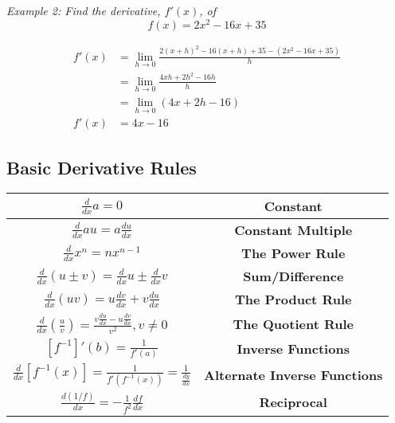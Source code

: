         \noindent \color{blue} \textit{Example 2: Find the derivative, $f'(x)$, of } \\

        \begin{equation*}
            f(x) = 2x^2-16x+35
        \end{equation*} \color{black}

        \begin{align*}
            f'(x) &= \lim_{h\to 0} \frac{2(x+h)^2-16(x+h)+35-(2x^2-16x+35)}{h} \\
            &= \lim_{h\to 0} \frac{4xh+2h^2-16h}{h} \\
            &= \lim_{h\to 0} (4x+2h-16) \\
            f'(x) &= 4x-16
        \end{align*}


    \subsection{Basic Derivative Rules}
        \begin{center}
            \begin{tabular}{|c|c|}
                \hline
                $\frac{d}{dx}a = 0$ & \textbf{Constant} \\
                \hline
                $\frac{d}{dx}au = a\frac{du}{dx}$ & \textbf{Constant Multiple} \\
                \hline
                $\frac{d}{dx}x^n=nx^{n-1}$ & \color{purple} \textbf{The Power Rule} \color{black} \\
                \hline
                $\frac{d}{dx}(u\pm v) = \frac{d}{dx}u \pm \frac{d}{dx}v$ & \textbf{Sum/Difference}\\
                \hline
                $\frac{d}{dx}(uv) = u\frac{dv}{dx}+v\frac{du}{dx}$ & \color{purple}
                \textbf{The Product Rule} \color{black} \\
                \hline
                $\frac{d}{dx}\left(\frac{u}{v}\right)=\frac{v\frac{du}{dx}-u\frac{dv}{dx}}{v^2},
                v\not = 0$ & \color{purple} \textbf{The Quotient Rule} \color{black} \\
                \hline
                $[f^{-1}]'(b)=\frac{1}{f'(a)}$ & \textbf{Inverse Functions} \\
                \hline
                $\frac{d}{dx}[f^{-1}(x)]=\frac{1}{f'(f^{-1}(x))}=\frac{1}{\frac{dy}{dx}}$ &
                \textbf{Alternate Inverse Functions} \\
                \hline
                $\frac{d(1/f)}{dx}=-\frac{1}{f^2}\frac{df}{dx}$ & \textbf{Reciprocal} \\
                \hline
            \end{tabular}
        \end{center}


